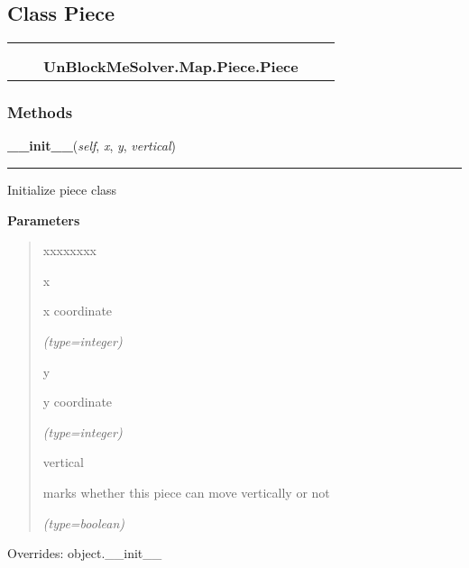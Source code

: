\subsection{Class Piece}

    \label{UnBlockMeSolver:Map:Piece:Piece}
\begin{tabular}{cccccc}
\multicolumn{2}{r}{\settowidth{\BCL}{object}\multirow{2}{\BCL}{object}}
&&
  \\\cline{3-3}
  &&\multicolumn{1}{c|}{}
&&
  \\
&&\multicolumn{2}{l}{\textbf{UnBlockMeSolver.Map.Piece.Piece}}
\end{tabular}



  \subsubsection{Methods}

    \vspace{0.5ex}

\hspace{.8\funcindent}\begin{boxedminipage}{\funcwidth}

    \raggedright \textbf{\_\_init\_\_}(\textit{self}, \textit{x}, \textit{y}, \textit{vertical})

    \vspace{-1.5ex}

    \rule{\textwidth}{0.5\fboxrule}
\setlength{\parskip}{2ex}
    Initialize piece class

\setlength{\parskip}{1ex}
      \textbf{Parameters}
      \vspace{-1ex}

      \begin{quote}
        \begin{Ventry}{xxxxxxxx}

          \item[x]

          x coordinate

            {\it (type=integer)}

          \item[y]

          y coordinate

            {\it (type=integer)}

          \item[vertical]

          marks whether this piece can move vertically or not

            {\it (type=boolean)}

        \end{Ventry}

      \end{quote}

      Overrides: object.\_\_init\_\_

    \end{boxedminipage}

